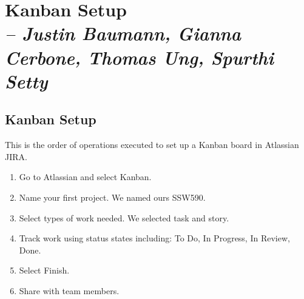 \chapter{Kanban Setup \\
\small{\textit{-- Justin Baumann, Gianna Cerbone, Thomas Ung, Spurthi Setty}} 
\label{Chapter::Kanbansetup}}

\section{Kanban Setup \label{Section:kanbansetup}}
This is the order of operations executed to set up a Kanban board in Atlassian JIRA.

\begin{enumerate}
\item Go to Atlassian and select Kanban.
\item Name your first project. We named ours SSW590.
\item Select types of work needed. We selected task and story. 
\item Track work using status states including: To Do, In Progress, In Review, Done.
\item Select Finish.
\item Share with team members.
\end{enumerate}